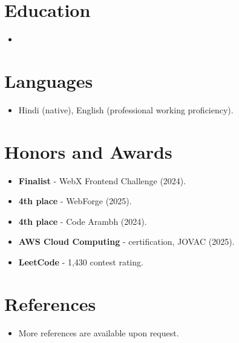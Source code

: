 \documentclass[11pt,a4paper,sans]{moderncv}
\begin{document}
\section{Education}
\vspace{1pt}
\begin{itemize}

\item{}

\end{itemize}


\section{Languages}
\vspace{1pt}
\begin{itemize}
\item {Hindi (native), English (professional working proficiency).}
\end{itemize}


\section{Honors and Awards}
\vspace{1pt}
\begin{itemize}
\item{\textbf{Finalist} - WebX Frontend Challenge (2024).}
\item{\textbf{4th place} - WebForge (2025).}
\item{\textbf{4th place} - Code Arambh (2024).}
\item{\textbf{AWS Cloud Computing} - certification, JOVAC (2025).}
\item{\textbf{LeetCode} - 1,430 contest rating.}
\end{itemize}


\section{References}
\vspace{1pt}
\begin{itemize}
\item{More references are available upon request.}
\end{itemize}
\end{document}
